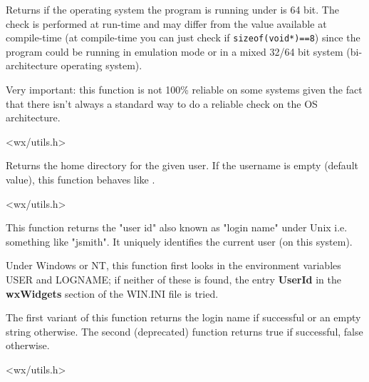 
Returns \true if the operating system the program is running under is 64 bit.
The check is performed at run-time and may differ from the value available at
compile-time (at compile-time you can just check if {\tt sizeof(void*)==8})
since the program could be running in emulation mode or in a mixed 32/64 bit system
(bi-architecture operating system).

Very important: this function is not 100\% reliable on some systems given the fact
that there isn't always a standard way to do a reliable check on the OS architecture.


<wx/utils.h>


\label{wxgetuserhome}


Returns the home directory for the given user. If the username is empty
(default value), this function behaves like
.


<wx/utils.h>


\label{wxgetuserid}



This function returns the "user id" also known as "login name" under Unix i.e.
something like "jsmith". It uniquely identifies the current user (on this system).

Under Windows or NT, this function first looks in the environment
variables USER and LOGNAME; if neither of these is found, the entry {\bf UserId}\rtfsp
in the {\bf wxWidgets} section of the WIN.INI file is tried.

The first variant of this function returns the login name if successful or an
empty string otherwise. The second (deprecated) function returns true
if successful, false otherwise.




<wx/utils.h>


\label{wxgetusername}

